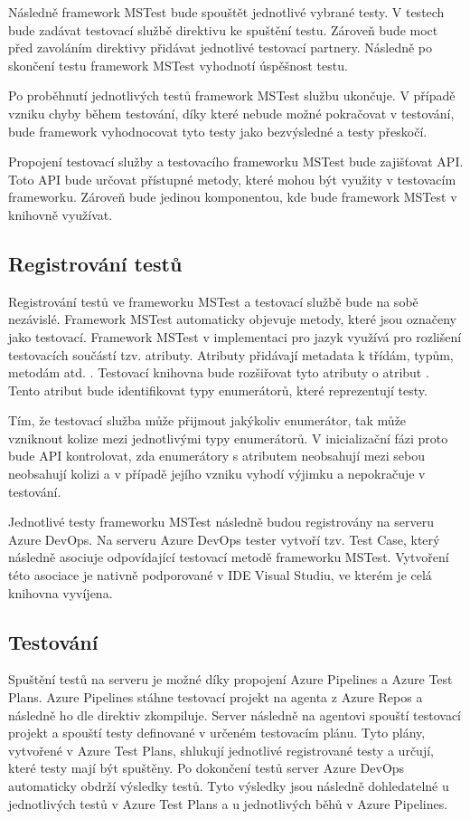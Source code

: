 Následně framework MSTest bude spouštět jednotlivé vybrané testy. V testech bude zadávat testovací službě direktivu ke spuštění testu. Zároveň bude moct před zavoláním direktivy přidávat jednotlivé testovací partnery. Následně po skončení testu framework MSTest vyhodnotí úspěšnost testu.

Po proběhnutí jednotlivých testů framework MSTest službu ukončuje. V případě vzniku chyby během testování, díky které nebude možné pokračovat v testování, bude framework vyhodnocovat tyto testy jako bezvýsledné a testy přeskočí.

Propojení testovací služby a testovacího frameworku MSTest bude zajišťovat API. Toto API bude určovat přístupné metody, které mohou být využity v testovacím frameworku. Zároveň bude jedinou komponentou, kde bude framework MSTest v knihovně využívat.

\subsection{Registrování testů}\label{sec:reg_test_design}
Registrování testů ve frameworku MSTest a testovací službě bude na sobě nezávislé. Framework MSTest automaticky objevuje metody, které jsou označeny jako testovací. Framework MSTest v implementaci pro jazyk \csharp{} využívá pro rozlišení testovacích součástí tzv. atributy. Atributy přidávají metadata k třídám, typům, metodám atd. \cite{attribute_docs}. Testovací knihovna bude rozšiřovat tyto atributy o atribut . Tento atribut bude identifikovat typy enumerátorů, které reprezentují testy. 

Tím, že testovací služba může přijmout jakýkoliv enumerátor, tak může vzniknout kolize mezi jednotlivými typy enumerátorů. V inicializační fázi proto bude API kontrolovat, zda enumerátory s atributem  neobsahují mezi sebou neobsahují kolizi a v případě jejího vzniku vyhodí výjimku a nepokračuje v testování.

Jednotlivé testy frameworku MSTest následně budou registrovány na serveru Azure DevOps. Na serveru Azure DevOps tester vytvoří tzv. Test Case, který následně asociuje odpovídající testovací metodě frameworku MSTest. Vytvoření této asociace je nativně podporované v IDE Visual Studiu, ve kterém je celá knihovna vyvíjena. 


\subsection{Testování}
Spuštění testů na serveru je možné díky propojení Azure Pipelines a Azure Test Plans. Azure Pipelines stáhne testovací projekt na agenta z Azure Repos a následně ho dle direktiv zkompiluje. Server následně na agentovi spouští testovací projekt a spouští testy definované v určeném testovacím plánu. Tyto plány, vytvořené v Azure Test Plans, shlukují jednotlivé registrované testy a určují, které testy mají být spuštěny. Po dokončení testů server Azure DevOps automaticky obdrží výsledky testů. Tyto výsledky jsou následně dohledatelné u jednotlivých testů v Azure Test Plans a u jednotlivých běhů v Azure Pipelines. 


